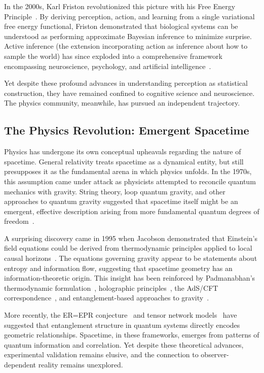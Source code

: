 \documentclass[11pt]{article}
\begin{document}
In the 2000s, Karl Friston revolutionized this picture with his Free Energy Principle~\cite{Friston2010}. By deriving perception, action, and learning from a single variational free energy functional, Friston demonstrated that biological systems can be understood as performing approximate Bayesian inference to minimize surprise. Active inference (the extension incorporating action as inference about how to sample the world) has since exploded into a comprehensive framework encompassing neuroscience, psychology, and artificial intelligence~\cite{parr2022active}.

Yet despite these profound advances in understanding perception as statistical construction, they have remained confined to cognitive science and neuroscience. The physics community, meanwhile, has pursued an independent trajectory.

\subsection{The Physics Revolution: Emergent Spacetime}

Physics has undergone its own conceptual upheavals regarding the nature of spacetime. General relativity treats spacetime as a dynamical entity, but still presupposes it as the fundamental arena in which physics unfolds. In the 1970s, this assumption came under attack as physicists attempted to reconcile quantum mechanics with gravity. String theory, loop quantum gravity, and other approaches to quantum gravity suggested that spacetime itself might be an emergent, effective description arising from more fundamental quantum degrees of freedom~\cite{Carlip2014}.

A surprising discovery came in 1995 when Jacobson demonstrated that Einstein's field equations could be derived from thermodynamic principles applied to local causal horizons~\cite{Jacobson1995}. The equations governing gravity appear to be statements about entropy and information flow, suggesting that spacetime geometry has an information-theoretic origin. This insight has been reinforced by Padmanabhan's thermodynamic formulation~\cite{Padmanabhan2010}, holographic principles~\cite{Bousso2002}, the AdS/CFT correspondence~\cite{Maldacena1999}, and entanglement-based approaches to gravity~\cite{VanRaamsdonk2010}.

More recently, the ER=EPR conjecture~\cite{MaldacenaSusskind2013} and tensor network models~\cite{Swingle2012} have suggested that entanglement structure in quantum systems directly encodes geometric relationships. Spacetime, in these frameworks, emerges from patterns of quantum information and correlation. Yet despite these theoretical advances, experimental validation remains elusive, and the connection to observer-dependent reality remains unexplored.
\end{document}
